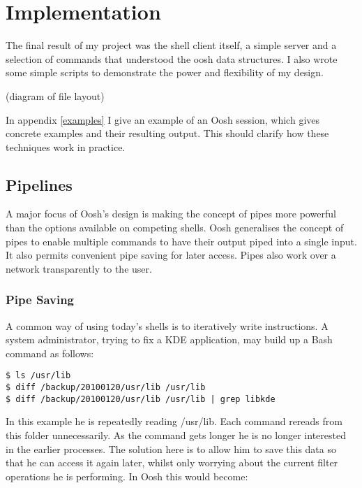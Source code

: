 \documentclass[12pt,twoside,notitlepage]{report}
\begin{document}

\cleardoublepage

\chapter{Implementation}

The final result of my project was the shell client itself, a simple server and
a selection of commands that understood the oosh data structures. I also wrote
some simple scripts to demonstrate the power and flexibility of my design.

(diagram of file layout)

In appendix \ref{examples} I give an example of an Oosh session, which
gives concrete examples and their resulting output. This should clarify how
these techniques work in practice.

\section{Pipelines}
A major focus of Oosh's design is making the concept of pipes more powerful than
the options available on competing shells. Oosh generalises the concept of pipes
to enable multiple commands to have their output piped into a single input. It
also permits convenient pipe saving for later access. Pipes also work over a
network transparently to the user.

\subsection{Pipe Saving}
A common way of using today's shells is to iteratively write instructions. A
system administrator, trying to fix a KDE application, may build up a Bash command as
follows:
\begin{verbatim}
$ ls /usr/lib
$ diff /backup/20100120/usr/lib /usr/lib
$ diff /backup/20100120/usr/lib /usr/lib | grep libkde
\end{verbatim}

In this example he is repeatedly reading /usr/lib. Each command rereads from
this folder unnecessarily. As the command gets longer he is no longer interested in
the earlier processes. The solution here is to allow him to save this data so
that he can access it again later, whilst only worrying about the current filter
operations he is performing. In Oosh this would become:
\end{document}
